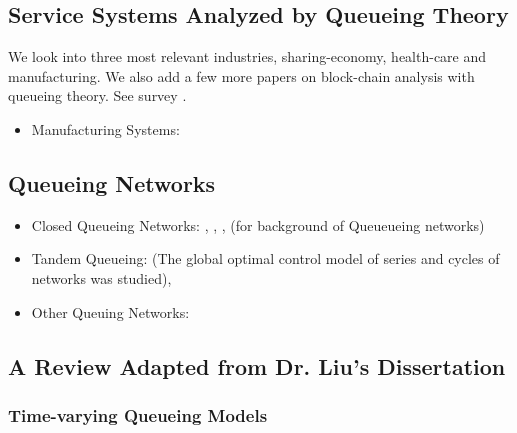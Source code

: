 \subsection{Service Systems Analyzed by Queueing Theory}
We look into three most relevant industries, sharing-economy, health-care and manufacturing. We also add a few more papers on block-chain analysis with queueing theory. See survey \citet{stidham1993survey}.
\begin{itemize}
	\item Manufacturing Systems: \citet{buzacott1986queueing}
\end{itemize}
\subsection{Queueing Networks}


\begin{itemize}
	\item Closed Queueing Networks: \citet{gordon1967closed},  \citet{yao1989decentralized}, \citet{buzacott1986queueing}, \citet{kelly2011reversibility} (for background of Queueueing networks)
	\item Tandem Queueing: \cite{weber1987optimal} (The global optimal control model of series and cycles of networks was
	studied),
	\item Other Queuing Networks: \citet{jackson1957networks}
\end{itemize}

\subsection{A Review Adapted from Dr. Liu's Dissertation}
\subsubsection{Time-varying Queueing Models}


